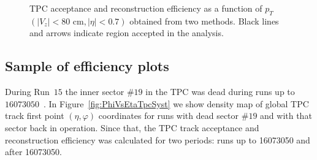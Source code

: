\begin{figure}[ht]
{	}%
	\caption[TPC acceptance and reconstruction efficiency as a function of $p_T$ $\left(|V_z|<80\textrm{ cm}, |\eta|<0.7\right)$ obtained from two methods.]{TPC acceptance and reconstruction efficiency as a function of $p_T$ $\left(|V_z|<80\textrm{ cm}, |\eta|<0.7\right)$ obtained from two methods. Black lines and arrows indicate region accepted in the analysis.}\label{fig:trackTPCefficiencyComparisonEtaPhi}
\end{figure}


\subsection{Sample of  efficiency plots}\label{subsec:sampleTpcEffPlots}

During Run~$15$ the inner sector $\#19$ in the TPC was dead during runs up to $16073050$~\cite{sector19inner}. In Figure~\ref{fig:PhiVsEtaTpcSyst} we show density map of global TPC track first point $(\eta,\varphi)$ coordinates for runs with dead sector $\#19$  and with that sector back in operation.
Since that, the TPC track acceptance and reconstruction efficiency was calculated for two periods: runs up to 16073050 and after 16073050.

